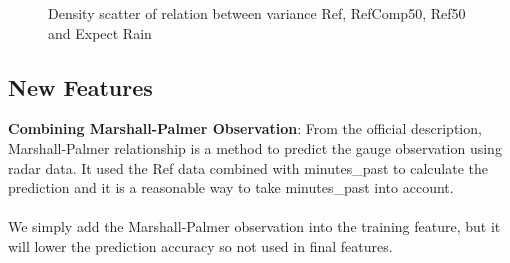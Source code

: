 \documentclass{article} %
\begin{document}
\begin{figure}[h]
\caption{Density scatter of relation between variance Ref, RefComp50, Ref50 and Expect Rain}
\end{figure}

\subsection{New Features}
\textbf{Combining Marshall-Palmer Observation}: From the official description, Marshall-Palmer relationship is a method to predict the gauge observation using radar data. It used the Ref data combined with minutes\_past to calculate the prediction and it is a reasonable way to take minutes\_past into account.\\
\\We simply add the  Marshall-Palmer observation into the training feature, but it will lower the prediction accuracy so not used in final features.\\\\
\end{document}
